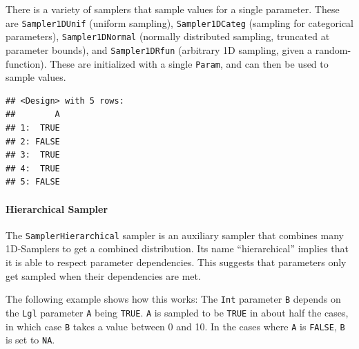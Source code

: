 \documentclass[]{scrbook}
\newenvironment{Shaded}{\begin{snugshade}}{\end{snugshade}}
\newcommand{\DecValTok}[1]{\textcolor[rgb]{0.00,0.00,0.81}{#1}}
\newcommand{\KeywordTok}[1]{\textcolor[rgb]{0.13,0.29,0.53}{\textbf{#1}}}
\newcommand{\NormalTok}[1]{#1}
\newcommand{\OperatorTok}[1]{\textcolor[rgb]{0.81,0.36,0.00}{\textbf{#1}}}
\newcommand{\StringTok}[1]{\textcolor[rgb]{0.31,0.60,0.02}{#1}}
\let\oldparagraph\paragraph
\renewcommand{\paragraph}[1]{\oldparagraph{#1}\mbox{}}
\renewenvironment{Shaded} {\begin{snugshade}\small} {\end{snugshade}}
\begin{document}
There is a variety of samplers that sample values for a single parameter.
These are \texttt{Sampler1DUnif} (uniform sampling), \texttt{Sampler1DCateg} (sampling for categorical parameters), \texttt{Sampler1DNormal} (normally distributed sampling, truncated at parameter bounds), and \texttt{Sampler1DRfun} (arbitrary 1D sampling, given a random-function).
These are initialized with a single \texttt{Param}, and can then be used to sample values.

\begin{Shaded}
\end{Shaded}

\begin{verbatim}
## <Design> with 5 rows:
##        A
## 1:  TRUE
## 2: FALSE
## 3:  TRUE
## 4:  TRUE
## 5: FALSE
\end{verbatim}

\hypertarget{hierarchical-sampler}{%
\paragraph{Hierarchical Sampler}\label{hierarchical-sampler}}

The \texttt{SamplerHierarchical} sampler is an auxiliary sampler that combines many 1D-Samplers to get a combined distribution.
Its name ``hierarchical'' implies that it is able to respect parameter dependencies.
This suggests that parameters only get sampled when their dependencies are met.

The following example shows how this works: The \texttt{Int} parameter \texttt{B} depends on the \texttt{Lgl} parameter \texttt{A} being \texttt{TRUE}.
\texttt{A} is sampled to be \texttt{TRUE} in about half the cases, in which case \texttt{B} takes a value between 0 and 10.
In the cases where \texttt{A} is \texttt{FALSE}, \texttt{B} is set to \texttt{NA}.
\end{document}
